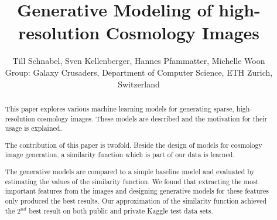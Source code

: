 \documentclass[10pt,conference,compsocconf]{IEEEtran}
\newcommand\TODO[1]{\textcolor{red}{#1}} %
\begin{document}
\title{Generative Modeling of high-resolution Cosmology Images}

\author{Till Schnabel, Sven Kellenberger, Hannes Pfammatter, Michelle Woon \\Group: Galaxy Crusaders, Department of Computer Science, ETH Zurich, Switzerland}

\maketitle

\begin{abstract}
This paper explores various machine learning models for generating sparse, high-resolution cosmology images. These models are described and the motivation for their usage is explained.

The contribution of this paper is twofold. Beside the design of models for cosmology image generation, a similarity function which is part of our data is learned.

The generative models are compared to a simple baseline model and evaluated by estimating the values of the similarity function. We found that extracting the most important features from the images and designing generative models for these features only produced the best results. Our approximation of the similarity function achieved the $2^{nd}$ best result on both public and private Kaggle test data sets.




\end{abstract}
\end{document}
